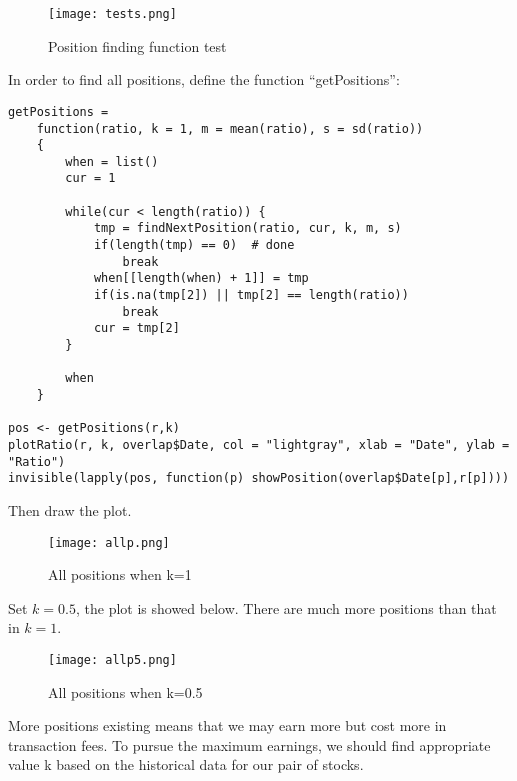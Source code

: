\documentclass{article}
\begin{document}
\begin{figure}[H] 
\begin{center} 
\texttt{[image: tests.png]}  
\caption{Position finding function test} 
\label{testp} 
\end{center} 
\end{figure}
In order to find all positions, define the function ``getPositions'':
\begin{verbatim}
getPositions =
    function(ratio, k = 1, m = mean(ratio), s = sd(ratio))
    {
        when = list()
        cur = 1
        
        while(cur < length(ratio)) {
            tmp = findNextPosition(ratio, cur, k, m, s)
            if(length(tmp) == 0)  # done
                break
            when[[length(when) + 1]] = tmp
            if(is.na(tmp[2]) || tmp[2] == length(ratio))
                break
            cur = tmp[2]
        }
        
        when
    }

pos <- getPositions(r,k)
plotRatio(r, k, overlap$Date, col = "lightgray", xlab = "Date", ylab = "Ratio")
invisible(lapply(pos, function(p) showPosition(overlap$Date[p],r[p])))
\end{verbatim}
Then draw the plot. 
\begin{figure}[H] 
\begin{center} 
\texttt{[image: allp.png]}  
\caption{All positions when k=1} 
\label{testp1} 
\end{center} 
\end{figure}

Set $k=0.5$, the plot is showed below. There are much more positions than that in $k=1$.

\begin{figure}[H] 
\begin{center} 
\texttt{[image: allp5.png]}  
\caption{All positions when k=0.5} 
\label{testp} 
\end{center} 
\end{figure}

More positions existing means that we may earn more but cost more in transaction fees. To pursue the maximum earnings, we should find appropriate value k based on the historical data for our pair of stocks.
\end{document}
